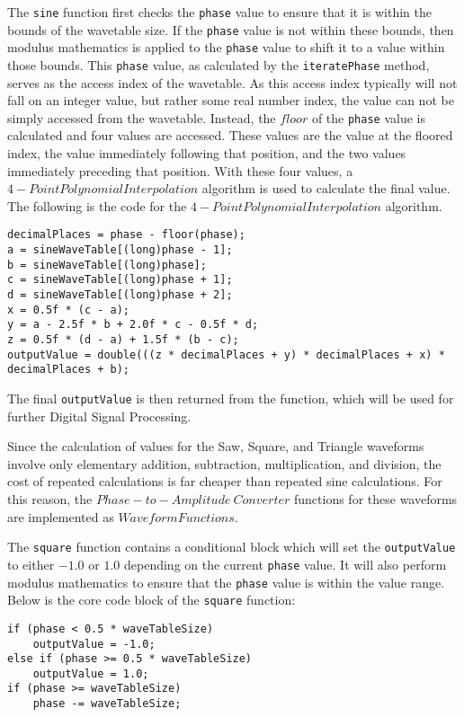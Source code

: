 \documentclass[a4paper,12pt]{report}
\begin{document}
The \texttt{sine} function first checks the \texttt{phase} value to ensure that it is within the bounds of the wavetable size. If the \texttt{phase} value is not within these bounds, then modulus mathematics is applied to the \texttt{phase} value to shift it to a value within those bounds. This \texttt{phase} value, as calculated by the \texttt{iteratePhase} method, serves as the access index of the wavetable. As this access index typically will not fall on an integer value, but rather some real number index, the value can not be simply accessed from the wavetable. Instead, the $floor$ of the \texttt{phase} value is calculated and four values are accessed. These values are the value at the floored index, the value immediately following that position, and the two values immediately preceding that position. With these four values, a $4-Point Polynomial Interpolation$ algorithm is used to calculate the final value. The following is the code for the $4-Point Polynomial Interpolation$ algorithm.
\begin{lstlisting}
decimalPlaces = phase - floor(phase);
a = sineWaveTable[(long)phase - 1];
b = sineWaveTable[(long)phase];
c = sineWaveTable[(long)phase + 1];
d = sineWaveTable[(long)phase + 2];
x = 0.5f * (c - a);
y = a - 2.5f * b + 2.0f * c - 0.5f * d;
z = 0.5f * (d - a) + 1.5f * (b - c);
outputValue = double(((z * decimalPlaces + y) * decimalPlaces + x) * decimalPlaces + b);
\end{lstlisting}
The final \texttt{outputValue} is then returned from the function, which will be used for further Digital Signal Processing.

Since the calculation of values for the Saw, Square, and Triangle waveforms involve only elementary addition, subtraction, multiplication, and division, the cost of repeated calculations is far cheaper than repeated sine calculations. For this reason, the $Phase-to-Amplitude\ Converter$ functions for these waveforms are implemented as $Waveform Functions$.

The \texttt{square} function contains a conditional block which will set the \texttt{outputValue} to either $-1.0$ or $1.0$ depending on the current \texttt{phase} value. It will also perform modulus mathematics to ensure that the \texttt{phase} value is within the value range. Below is the core code block of the \texttt{square} function:
\begin{lstlisting}
if (phase < 0.5 * waveTableSize)
    outputValue = -1.0;
else if (phase >= 0.5 * waveTableSize)
    outputValue = 1.0;
if (phase >= waveTableSize)
    phase -= waveTableSize;
\end{lstlisting}
\end{document}
